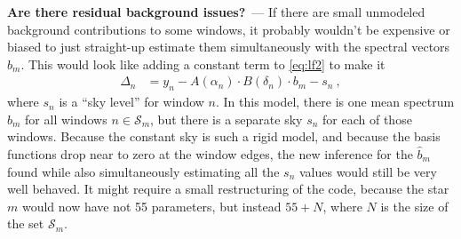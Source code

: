 \documentclass[11pt]{article}
\renewcommand{\paragraph}[1]{\medskip\par\noindent\textbf{#1}~---}
\begin{document}
\paragraph{Are there residual background issues?}
If there are small unmodeled background contributions to some windows, it probably wouldn't be expensive or biased to just straight-up estimate them simultaneously with the spectral vectors $\hat{b}_m$.
This would look like adding a constant term to \eqref{eq:lf2} to make it
\begin{align}
    \Delta_n &= y_n - A(\alpha_n)\cdot B(\delta_n)\cdot b_m - s_n~,
\end{align}
where $s_n$ is a ``sky level'' for window $n$.
In this model, there is one mean spectrum $b_m$ for all windows $n\in\mathscr{S}_m$, but there is a separate sky $s_n$ for each of those windows.
Because the constant sky is such a rigid model, and because the basis functions drop near to zero at the window edges, the new inference for the $\hat{b}_m$ found while also simultaneously estimating all the $s_n$ values would still be very well behaved.
It might require a small restructuring of the code, because the star $m$ would now have not 55 parameters, but instead $55+N$, where $N$ is the size of the set $\mathscr{S}_m$.
\end{document}
